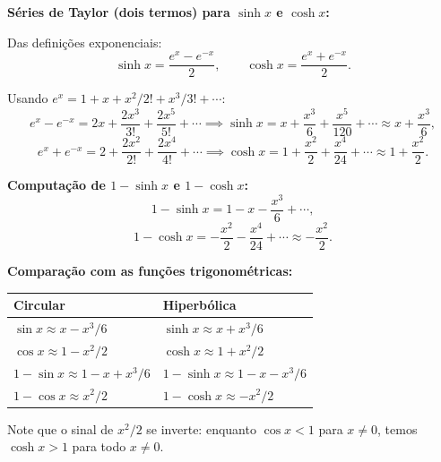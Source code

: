\textbf{Séries de Taylor (dois termos) para $\sinh x$ e $\cosh x$:}

Das definições exponenciais:
\[
\sinh x = \frac{e^x-e^{-x}}{2},\qquad \cosh x = \frac{e^x+e^{-x}}{2}.
\]

Usando $e^x=1+x+x^2/2!+x^3/3!+\cdots$:
\[
e^x-e^{-x} = 2x + \frac{2x^3}{3!}+\frac{2x^5}{5!}+\cdots \implies \sinh x = x+\frac{x^3}{6}+\frac{x^5}{120}+\cdots\approx x+\frac{x^3}{6},
\]
\[
e^x+e^{-x} = 2+\frac{2x^2}{2!}+\frac{2x^4}{4!}+\cdots \implies \cosh x = 1+\frac{x^2}{2}+\frac{x^4}{24}+\cdots\approx 1+\frac{x^2}{2}.
\]

\textbf{Computação de $1-\sinh x$ e $1-\cosh x$:}
\[
1-\sinh x = 1 - x - \frac{x^3}{6} + \cdots,
\]
\[
1-\cosh x = -\frac{x^2}{2} - \frac{x^4}{24} + \cdots \approx -\frac{x^2}{2}.
\]

\textbf{Comparação com as funções trigonométricas:}

\begin{center}
\begin{tabular}{ll}
\hline
Circular & Hiperbólica \\
\hline
$\sin x \approx x - x^3/6$ & $\sinh x \approx x + x^3/6$ \\
$\cos x \approx 1 - x^2/2$ & $\cosh x \approx 1 + x^2/2$ \\
$1-\sin x \approx 1-x+x^3/6$ & $1-\sinh x \approx 1-x-x^3/6$ \\
$1-\cos x \approx x^2/2$ & $1-\cosh x \approx -x^2/2$ \\
\hline
\end{tabular}
\end{center}

Note que o sinal de $x^2/2$ se inverte: enquanto $\cos x<1$ para $x\ne0$, temos $\cosh x>1$ para todo $x\ne0$.